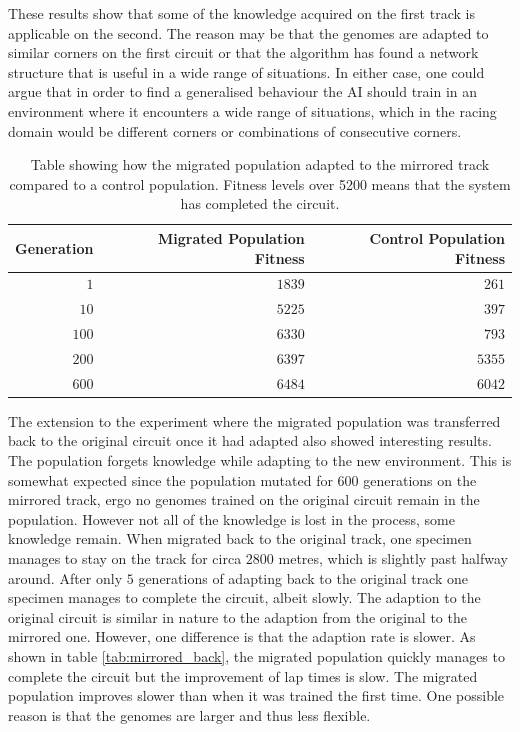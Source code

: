 \noindent
These results show that some of the knowledge acquired on the first track is applicable on the second. The reason may be that the genomes are adapted to similar corners on the first circuit or that the algorithm has found a network structure that is useful in a wide range of situations. In either case, one could argue that in order to find a generalised behaviour the AI should train in an environment where it encounters a wide range of situations, which in the racing domain would be different corners or combinations of consecutive corners. 

\begin{table}[H] 
  \centering
  \begin{tabular}{rrr}
    \toprule
    Generation & Migrated Population Fitness & Control Population Fitness\\
    \midrule
    $1$     & $1839$ & $261$    \\
    $10$    & $5225$ & $397$    \\
    $100$   & $6330$ & $793$    \\
    $200$   & $6397$ & $5355$   \\
    $600$   & $6484$ & $6042$   \\
    \bottomrule
  \end{tabular}
  \caption{Table showing how the migrated population adapted to the mirrored track compared to a control population. Fitness levels over 5200 means that the system has completed the circuit.}
  \label{tab:mirrored}
\end{table}

The extension to the experiment where the migrated population was transferred back to the original circuit once it had adapted also showed interesting results. The population forgets knowledge while adapting to the new environment. This is somewhat expected since the population mutated for 600 generations on the mirrored track, ergo no genomes trained on the original circuit remain in the population. However not all of the knowledge is lost in the process, some knowledge remain. When migrated back to the original track, one specimen manages to stay on the track for circa $2800$ metres, which is slightly past halfway around. After only $5$ generations of adapting back to the original track one specimen manages to complete the circuit, albeit slowly. The adaption to the original circuit is similar in nature to the adaption from the original to the mirrored one. However, one difference is that the adaption rate is slower. As shown in table \ref{tab:mirrored_back}, the migrated population quickly manages to complete the circuit but the improvement of lap times is slow. The migrated population improves slower than when it was trained the first time. One possible reason is that the genomes are larger and thus less flexible. 

